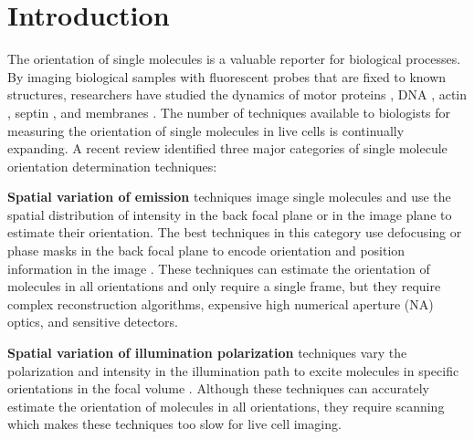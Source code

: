 \documentclass[10pt]{article}
\begin{document}




\section{Introduction}
The orientation of single molecules is a valuable reporter for biological
processes. By imaging biological samples with fluorescent probes that are fixed
to known structures, researchers have studied the dynamics of motor proteins
\cite{peterman2001, forkey2003}, DNA \cite{backer2016}, actin \cite{mehta2016},
septin \cite{demay2011, mcquilken2017}, and membranes \cite{anantharam2010}. The
number of techniques available to biologists for measuring the orientation of
single molecules in live cells is continually expanding. A recent review
\cite{backlund2014} identified three major categories of single molecule
orientation determination techniques:

\textbf{Spatial variation of emission} techniques image single molecules and use
the spatial distribution of intensity in the back focal plane \cite{lieb2004} or
in the image plane \cite{backer2014} to estimate their orientation. The best
techniques in this category use defocusing or phase masks in the back focal
plane to encode orientation and position information in the image
\cite{agrawal2012}. These techniques can estimate the orientation of
molecules in all orientations and only require a single frame, but they
require complex reconstruction algorithms, expensive high numerical aperture
(NA) optics, and sensitive detectors. 

\textbf{Spatial variation of illumination polarization} techniques vary the
polarization and intensity in the illumination path to excite molecules in
specific orientations in the focal volume \cite{debarre2004}. Although these
techniques can accurately estimate the orientation of molecules in all
orientations, they require scanning which makes these techniques too slow for
live cell imaging.
\end{document}
